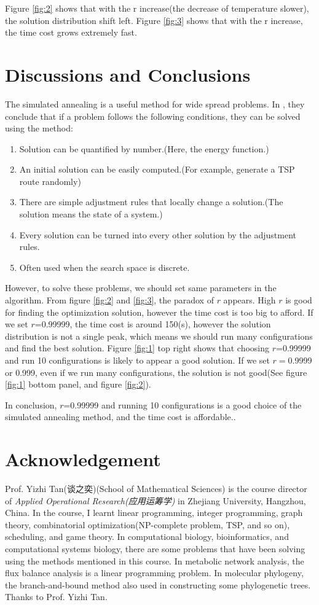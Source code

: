\documentclass[10.5pt,a4paper]{article}
\begin{document}
Figure \ref{fig:2} shows that with the r increase(the decrease of temperature slower), the solution distribution shift left. Figure \ref{fig:3} shows that with the r increase, the time cost grows extremely fast.
\section{Discussions and Conclusions}
The simulated annealing is a useful method for wide spread problems. In \cite{book,3}, they conclude that if a problem follows the following conditions, they can be solved using the method:
\begin{enumerate}
\item Solution can be quantified by number.(Here, the energy function.)
\item An initial solution can be easily computed.(For example, generate a TSP route randomly)
\item There are simple adjustment rules that locally change a solution.(The solution means the state of a system.)
\item Every solution can be turned into every other solution by the adjustment rules.
\item Often used when the search space is discrete.
\end{enumerate}

However, to solve these problems, we should set same parameters in the algorithm. From figure \ref{fig:2} and \ref{fig:3}, the paradox of $r$ appears. High $r$ is good for finding the optimization solution, however the time cost is too big to afford. If we set $r$=0.99999, the time cost is around 150(s), however the solution distribution is not a single peak, which means we should run many configurations and find the best solution. Figure \ref{fig:1} top right shows that choosing $r$=0.99999 and run 10 configurations is likely to appear a good solution. If we set $r=$0.9999 or 0.999, even if we run many configurations, the solution is not good(See figure \ref{fig:1} bottom panel, and figure \ref{fig:2}).

In conclusion, $r$=0.99999 and running 10 configurations is a good choice of the simulated annealing method, and the time cost is affordable..


\section{Acknowledgement}
Prof. Yizhi Tan(谈之奕)(School of Mathematical Sciences) is the course director of \textit{Applied Operational Research(应用运筹学)} in Zhejiang University, Hangzhou, China. In the course, I learnt linear programming, integer programming, graph theory, combinatorial optimization(NP-complete problem, TSP, and so on), scheduling, and game theory. In computational biology, bioinformatics, and computational systems biology, there are some problems that have been solving using the methods mentioned in this course. In metabolic network analysis, the flux balance analysis is a linear programming problem. In molecular phylogeny, the branch-and-bound method also used in constructing some phylogenetic trees.  Thanks to Prof. Yizhi Tan.
\end{document}
